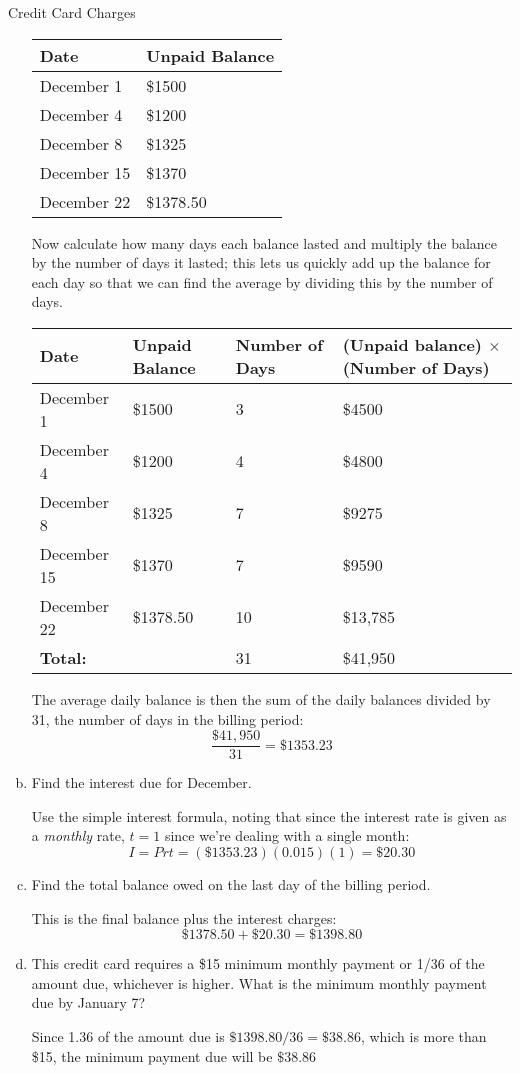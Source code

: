 \begin{example}[https://www.youtube.com/watch?v=ZUEQu_e2TqY]{Credit Card Charges}
\begin{enumerate}[(a)]
\begin{center}
\begin{tabular}{l l}
Date & Unpaid Balance\\
\hline
December 1 & \$1500\\
December 4 & \$1200\\
December 8 & \$1325\\
December 15 & \$1370\\
December 22 & \$1378.50\\
\end{tabular}
\end{center}

Now calculate how many days each balance lasted and multiply the balance by the number of days it lasted; this lets us quickly add up the balance for each day so that we can find the average by dividing this by the number of days.
\begin{center}
\begin{tabular}{l l p{0.7in} p{1.5in}}
Date & Unpaid Balance & Number of Days & (Unpaid balance) $\times$ (Number of Days)\\
\hline
December 1 & \$1500 & 3 & \$4500\\
December 4 & \$1200 & 4 & \$4800\\
December 8 & \$1325 & 7 & \$9275\\
December 15 & \$1370 & 7 & \$9590\\
December 22 & \$1378.50 & 10 & \$13,785\\
\hline
\textbf{Total:} & & 31 & \$41,950
\end{tabular}
\end{center}

The average daily balance is then the sum of the daily balances divided by 31, the number of days in the billing period:
\[\dfrac{\$41,950}{31} = \boxed{\$1353.23}\]

\item Find the interest due for December.

Use the simple interest formula, noting that since the interest rate is given as a \textit{monthly} rate, $t=1$ since we're dealing with a single month:
\[I=Prt = (\$1353.23)(0.015)(1) = \boxed{\$20.30}\]

\item Find the total balance owed on the last day of the billing period.

This is the final balance plus the interest charges:
\[\$1378.50 + \$20.30 = \boxed{\$1398.80}\]

\item This credit card requires a \$15 minimum monthly payment or 1/36 of the amount due, whichever is higher.  What is the minimum monthly payment due by January 7?

Since 1.36 of the amount due is $\$1398.80/36 = \$38.86$, which is more than \$15, the minimum payment due will be $\boxed{\$38.86}$
\end{enumerate}
\end{example}

